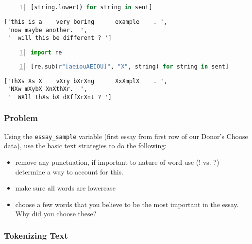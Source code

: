 \documentclass[10pt,parskip=half,
	toc=sectionentrywithdots,
	bibliography=totocnumbered,
	captions=tableheading,numbers=noendperiod]{scrartcl}
\providecommand{\tightlist}{%
  \setlength{\itemsep}{0pt}\setlength{\parskip}{0pt}}
\begin{document}
\begin{lstlisting}[language=Python,numbers=left,xleftmargin=20pt,xrightmargin=5pt,belowskip=5pt,aboveskip=5pt]
[string.lower() for string in sent]
\end{lstlisting}

\begin{lstlisting}[language={},postbreak={},numbers=none,xrightmargin=7pt,breakindent=0pt,aboveskip=5pt,belowskip=5pt]
['this is a    very boring      example    . ',
 'now maybe another.  ',
 '  will this be different ? ']
\end{lstlisting}

\begin{lstlisting}[language=Python,numbers=left,xleftmargin=20pt,xrightmargin=5pt,belowskip=5pt,aboveskip=5pt]
import re
\end{lstlisting}

\begin{lstlisting}[language=Python,numbers=left,xleftmargin=20pt,xrightmargin=5pt,belowskip=5pt,aboveskip=5pt]
[re.sub(r"[aeiouAEIOU]", "X", string) for string in sent]
\end{lstlisting}

\begin{lstlisting}[language={},postbreak={},numbers=none,xrightmargin=7pt,breakindent=0pt,aboveskip=5pt,belowskip=5pt]
['ThXs Xs X    vXry bXrXng      XxXmplX    . ',
 'NXw mXybX XnXthXr.  ',
 '  WXll thXs bX dXffXrXnt ? ']
\end{lstlisting}

\subsubsection{Problem}\label{problem}

Using the \texttt{essay\_sample} variable (first essay from first row of
our Donor's Choose data), use the basic text strategies to do the
following:

\begin{itemize}
\tightlist
\item
  remove any punctuation, if important to nature of word use (! vs. ?)
  determine a way to account for this.
\item
  make sure all words are lowercase
\item
  choose a few words that you believe to be the most important in the
  essay. Why did you choose these?
\end{itemize}

\subsubsection{Tokenizing Text}\label{tokenizing-text}
\end{document}
